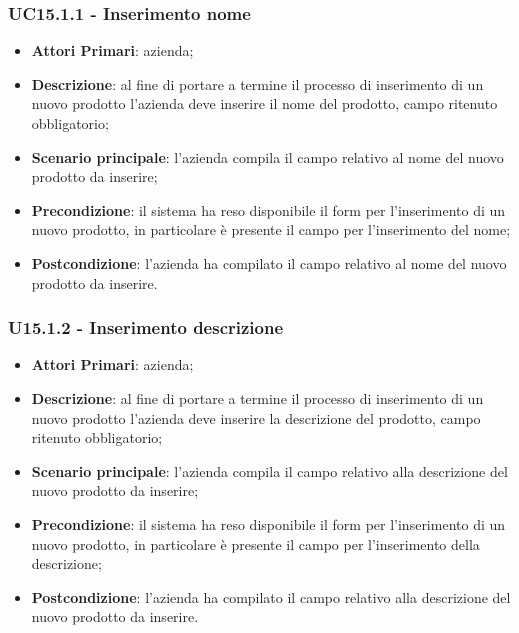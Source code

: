 \subsubsection{UC15.1.1 - Inserimento nome}
\begin{itemize}
	\item \textbf{Attori Primari}: azienda;
	\item \textbf{Descrizione}: al fine di portare a termine il processo di inserimento di un nuovo prodotto l'azienda deve inserire il nome del prodotto, campo ritenuto obbligatorio;
	\item \textbf{Scenario principale}: l'azienda compila il campo relativo al nome del nuovo prodotto da inserire;
	\item \textbf{Precondizione}: il sistema ha reso disponibile il form per l'inserimento di un nuovo prodotto, in particolare è presente il campo per l'inserimento del nome;
	\item \textbf{Postcondizione}: l'azienda ha compilato il campo relativo al nome del nuovo prodotto da inserire.
\end{itemize}
\subsubsection{U15.1.2 - Inserimento descrizione}
\begin{itemize}
	\item \textbf{Attori Primari}: azienda;
	\item \textbf{Descrizione}: al fine di portare a termine il processo di inserimento di un nuovo prodotto l'azienda deve inserire la descrizione del prodotto, campo ritenuto obbligatorio;
	\item \textbf{Scenario principale}: l'azienda compila il campo relativo alla descrizione del nuovo prodotto da inserire;
	\item \textbf{Precondizione}: il sistema ha reso disponibile il form per l'inserimento di un nuovo prodotto, in particolare è presente il campo per l'inserimento della descrizione;
	\item \textbf{Postcondizione}: l'azienda ha compilato il campo relativo alla descrizione del nuovo prodotto da inserire.
\end{itemize}
